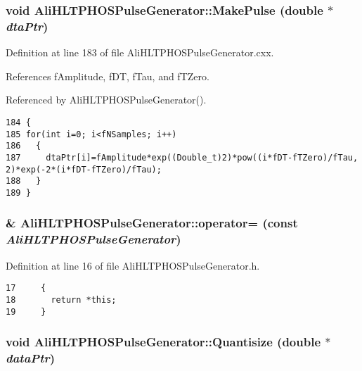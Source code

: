 \subsubsection{\setlength{\rightskip}{0pt plus 5cm}void Ali\-HLTPHOSPulse\-Generator::Make\-Pulse (double $\ast$ {\em dta\-Ptr})\hspace{0.3cm}{\tt  [private]}}\label{classAliHLTPHOSPulseGenerator_AliHLTPHOSPulseGeneratord0}




Definition at line 183 of file Ali\-HLTPHOSPulse\-Generator.cxx.

References f\-Amplitude, f\-DT, f\-Tau, and f\-TZero.

Referenced by Ali\-HLTPHOSPulse\-Generator().

\footnotesize\begin{verbatim}184 {
185 for(int i=0; i<fNSamples; i++)
186   {
187     dtaPtr[i]=fAmplitude*exp((Double_t)2)*pow((i*fDT-fTZero)/fTau, 2)*exp(-2*(i*fDT-fTZero)/fTau);
188   }  
189 }
\end{verbatim}\normalsize 


\subsubsection{\& Ali\-HLTPHOSPulse\-Generator::operator= (const  {\em Ali\-HLTPHOSPulse\-Generator})\hspace{0.3cm}{\tt  [inline]}}\label{classAliHLTPHOSPulseGenerator_AliHLTPHOSPulseGeneratora4}




Definition at line 16 of file Ali\-HLTPHOSPulse\-Generator.h.

\footnotesize\begin{verbatim}17     {
18       return *this; 
19     }
\end{verbatim}\normalsize 


\subsubsection{\setlength{\rightskip}{0pt plus 5cm}void Ali\-HLTPHOSPulse\-Generator::Quantisize (double $\ast$ {\em data\-Ptr})}\label{classAliHLTPHOSPulseGenerator_AliHLTPHOSPulseGeneratora11}


